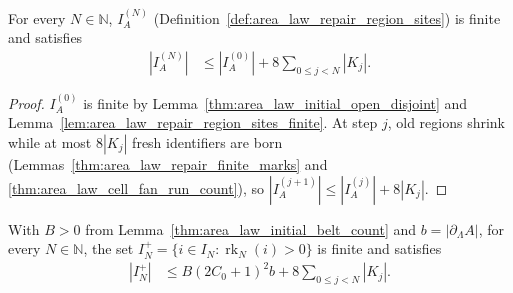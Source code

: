 \begin{lemma}
    \label{thm:area_law_repair_retained_prefix_count}
    \leanok
    For every $N\in\mathbb N$, $I_A^{(N)}$ (Definition~\ref{def:area_law_repair_region_sites}) is
    finite and satisfies
    \begin{align}
        |I_A^{(N)}| & \le |I_A^{(0)}|+8\sum_{0\le j<N}|K_j|.
        \label{eq:area_law_repair_retained_prefix_count}
    \end{align}
\end{lemma}

\begin{proof}
    \leanok
    $I_A^{(0)}$ is finite by Lemma~\ref{thm:area_law_initial_open_disjoint} and
    Lemma~\ref{lem:area_law_repair_region_sites_finite}. At step $j$, old regions shrink while at
    most $8|K_j|$ fresh identifiers are born (Lemmas~\ref{thm:area_law_repair_finite_marks} and
    \ref{thm:area_law_cell_fan_run_count}), so $|I_A^{(j+1)}|\le|I_A^{(j)}|+8|K_j|$.
\end{proof}

\begin{lemma}
    \label{thm:area_law_repair_positive_rank_prefix_count}
    \leanok
    With $B>0$ from Lemma~\ref{thm:area_law_initial_belt_count} and $b=|\partial_\Lambda A|$,
    for every $N\in\mathbb N$, the set $I_N^+=\{i\in I_N:\operatorname{rk}_N(i)>0\}$ is finite and satisfies
    \begin{align}
        |I_N^+| & \le B(2C_0+1)^2b+8\sum_{0\le j<N}|K_j|.
        \label{eq:area_law_repair_positive_rank_prefix_count}
    \end{align}
\end{lemma}

